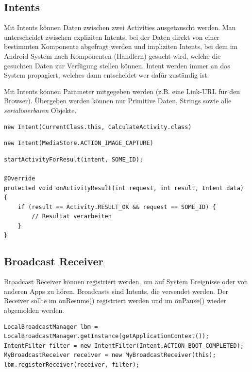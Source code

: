 \subsection{Intents}
Mit Intents können Daten zwischen zwei Activities ausgetauscht werden. Man unterscheidet zwischen expliziten Intents, bei der Daten direkt von einer bestimmten Komponente abgefragt werden und impliziten Intents, bei dem im Android System nach Komponenten (Handlern) gesucht wird, welche die gesuchten Daten zur Verfügung stellen können. Intent werden immer an das System propagiert, welches dann entscheidet wer dafür zuständig ist.

Mit Intents können Parameter mitgegeben werden (z.B. eine Link-URL für den Browser). Übergeben werden können nur Primitive Daten, Strings sowie alle \emph{serialisierbaren} Objekte.

\begin{lstlisting}[caption=Expliziter Intent mit der Klasse]
new Intent(CurrentClass.this, CalculateActivity.class)
\end{lstlisting}
\begin{lstlisting}[caption=Impliziter Intent mit einer Aktion]
new Intent(MediaStore.ACTION_IMAGE_CAPTURE)
\end{lstlisting}


\begin{lstlisting}[caption=Intents]
startActivityForResult(intent, SOME_ID);

@Override
protected void onActivityResult(int request, int result, Intent data) {
	if (result == Activity.RESULT_OK && request == SOME_ID) {
		// Resultat verarbeiten
	}
}
\end{lstlisting}



\subsection{Broadcast Receiver}
Broadcast Receiver können registriert werden, um auf System Ereignisse oder von anderen Apps zu hören. Broadcasts sind Intents, die versendet werden. Der Receiver sollte im onResume() registriert werden und im onPause() wieder abgemolden werden.
\begin{lstlisting}[caption=Broadcast Receiver]
LocalBroadcastManager lbm = 
LocalBroadcastManager.getInstance(getApplicationContext());
IntentFilter filter = new IntentFilter(Intent.ACTION_BOOT_COMPLETED);
MyBroadcastReceiver receiver = new MyBroadcastReceiver(this);
lbm.registerReceiver(receiver, filter);
\end{lstlisting}


